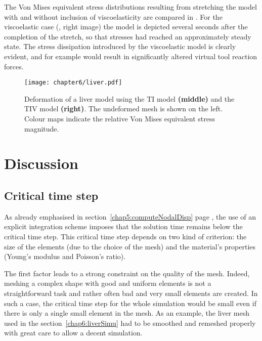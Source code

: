 \bigskip

The Von Mises equivalent stress distributions resulting from stretching the model with and without inclusion of viscoelasticity are compared in . For the viscoelastic case (, right image) the model is depicted several seconds after the completion of the stretch, so that stresses had reached an approximately steady state. The stress dissipation introduced by the viscoelastic model is clearly evident, and for example would result in significantly altered virtual tool reaction forces.	
%
\begin{figure}[ht]
\begin{center}
\texttt{[image: chapter6/liver.pdf]}
\end{center}
\caption[GPU solution times]{Deformation of a liver model using the TI model \textbf{(middle)} and the TIV model \textbf{(right)}. The undeformed mesh is shown on the left. Colour maps indicate the relative Von Mises equivalent stress magnitude.} 
\label{chap6:fig-liver}
\end{figure}
	
	
\section{Discussion}

	\subsection{Critical time step}	\label{chap6:criticalTimestep}
As already emphasised in section~\ref{chap5:computeNodalDisp} page \pageref{chap5:discussionTimestep}, the use of an explicit integration scheme imposes that the solution time remains below the critical time step. This critical time step depends on two kind of criterion: the size of the elements (due to the choice of the mesh) and the material's properties (Young's modulus and Poisson's ratio).

The first factor leads to a strong constraint on the quality of the mesh. Indeed, meshing a complex shape with good and uniform elements is not a straightforward task and rather often bad and very small elements are created. In such a case, the critical time step for the whole simulation would be small even if there is only a single small element in the mesh. As an example, the liver mesh used in the section~\ref{chap6:liverSimu} had to be smoothed and remeshed properly \ON with great care \OFF to allow a decent simulation.

